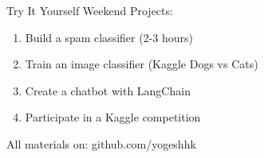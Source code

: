 \begin{frame}{Try It Yourself}
Weekend Projects:
\begin{enumerate}
\item Build a spam classifier (2-3 hours)
\item Train an image classifier (Kaggle Dogs vs Cats)
\item Create a chatbot with LangChain
\item Participate in a Kaggle competition
\end{enumerate}

All materials on: github.com/yogeshhk
\end{frame}

